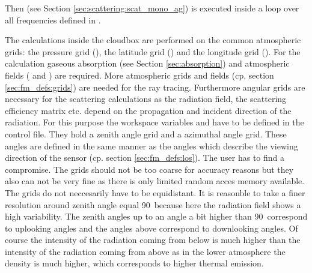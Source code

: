 Then (see Section
\ref{sec:scattering:scat_mono_ag}) is executed inside a loop over all frequencies
defined in .

\label{sec:scattering:grids}
The calculations inside the cloudbox are performed on the common
atmospheric grids: the pressure grid (), the
latitude grid () and the longitude grid
().  For the calculation gaseous absorption (see
Section \ref{sec:absorption}) and atmospheric fields
( and ) are required. More
atmospheric grids and fields (cp. section \ref{sec:fm_defs:grids}) are
needed for the ray tracing.  Furthermore angular grids are necessary
for the scattering calculations as the radiation field, the scattering
efficiency matrix etc. depend on the propagation and incident
direction of the radiation. For this purpose the workspace variables
 and  have to be
defined in the control file. They hold a zenith angle grid and a
azimuthal angle grid. These angles are defined in the same manner as
the angles which describe the viewing direction of the sensor (cp.
section \ref{sec:fm_defs:los}).  The user has to find a compromise.
The grids should not be too coarse for accuracy reasons but they also
can not be very fine as there is only limited random acces memory
available.  The grids do not neccesarily have to be equidistant. It is
reasonble to take a finer resolution around zenith angle equal
90\degree\ because here the radiation field shows a high variability.
The zenith angles up to an angle a bit higher than 90\degree\ 
correspond to uplooking angles and the angles above correspond to
downlooking angles. Of course the intensity of the radiation coming
from below is much higher than the intensity of the radiation coming
from above as in the lower atmosphere the density is much higher,
which corresponds to higher thermal emission.\newline

